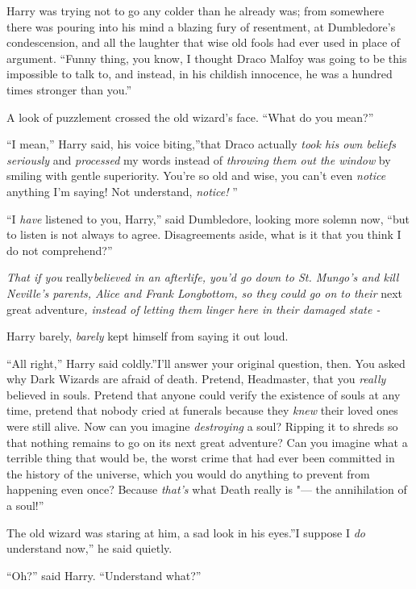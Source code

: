 Harry was trying not to go any colder than he already was; from
somewhere there was pouring into his mind a blazing fury of resentment,
at Dumbledore's condescension, and all the laughter that wise old fools
had ever used in place of argument. ``Funny thing, you know, I thought
Draco Malfoy was going to be this impossible to talk to, and instead, in
his childish innocence, he was a hundred times stronger than you.''

A look of puzzlement crossed the old wizard's face. ``What do you
mean?''

``I mean,'' Harry said, his voice biting,''that Draco actually
\emph{took his own beliefs seriously} and \emph{processed} my words
instead of \emph{throwing them out the window} by smiling with gentle
superiority. You're so old and wise, you can't even \emph{notice}
anything I'm saying! Not understand, \emph{notice!} ''

``I \emph{have} listened to you, Harry,'' said Dumbledore, looking more
solemn now, ``but to listen is not always to agree. Disagreements aside,
what is it that you think I do not comprehend?''

\emph{That if you} really\emph{believed in an afterlife, you'd go down
to St. Mungo's and kill Neville's parents, Alice and Frank Longbottom,
so they could go on to their} next great adventure\emph{, instead of
letting them linger here in their damaged state -}

Harry barely, \emph{barely} kept himself from saying it out loud.

``All right,'' Harry said coldly.''I'll answer your original question,
then. You asked why Dark Wizards are afraid of death. Pretend,
Headmaster, that you \emph{really} believed in souls. Pretend that
anyone could verify the existence of souls at any time, pretend that
nobody cried at funerals because they \emph{knew} their loved ones were
still alive. Now can you imagine \emph{destroying} a soul? Ripping it to
shreds so that nothing remains to go on its next great adventure? Can
you imagine what a terrible thing that would be, the worst crime that
had ever been committed in the history of the universe, which you would
do anything to prevent from happening even once? Because \emph{that's}
what Death really is "--- the annihilation of a soul!''

The old wizard was staring at him, a sad look in his eyes.''I suppose I
\emph{do} understand now,'' he said quietly.

``Oh?'' said Harry. ``Understand what?''

